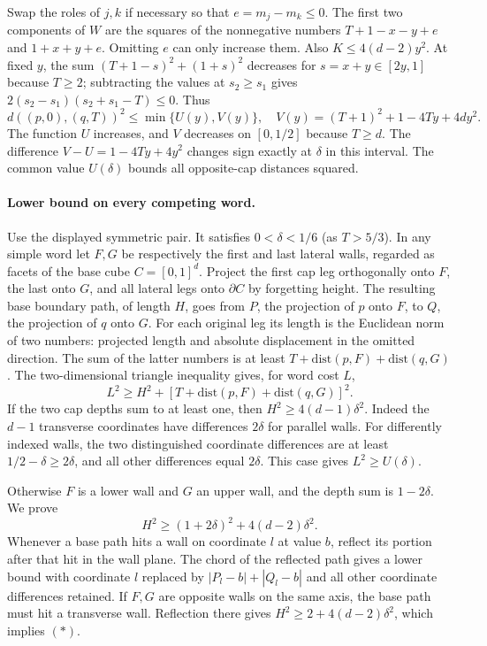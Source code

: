 \documentclass[10pt,letterpaper]{article}
\begin{document}
Swap the roles of $j,k$ if necessary so that $e=m_j-m_k\le0$.
The first two components of $W$ are the squares of the nonnegative
numbers $T+1-x-y+e$ and $1+x+y+e$. Omitting $e$ can only increase
them. Also $K\le4(d-2)y^2$. At fixed $y$, the sum
$(T+1-s)^2+(1+s)^2$ decreases for $s=x+y\in[2y,1]$ because
$T\ge2$; subtracting the values at $s_2\ge s_1$ gives
$2(s_2-s_1)(s_2+s_1-T)\le0$. Thus
\[
 d((p,0),(q,T))^2\le \min\{U(y),V(y)\},\quad
 V(y)=(T+1)^2+1-4Ty+4dy^2.
\]
The function $U$ increases, and $V$ decreases on $[0,1/2]$ because
$T\ge d$. The difference $V-U=1-4Ty+4y^2$ changes sign exactly
at $\delta$ in this interval. The common value $U(\delta)$ bounds
all opposite-cap distances squared.

\paragraph{Lower bound on every competing word.}
Use the displayed symmetric pair. It satisfies $0<\delta<1/6$
(as $T>5/3$). In any simple word let $F,G$ be respectively the first
and last lateral walls, regarded as facets of the base cube $C=[0,1]^d$.
Project the first cap leg orthogonally onto $F$, the last onto $G$,
and all lateral legs onto $\partial C$ by forgetting height.
The resulting base boundary path, of length $H$, goes from $P$, the
projection of $p$ onto $F$, to $Q$, the projection of $q$ onto $G$.
For each original leg its length is the Euclidean norm of two numbers:
projected length and absolute displacement in the omitted direction.
The sum of the latter numbers is at least
$T+\mathrm{dist}(p,F)+\mathrm{dist}(q,G)$.
The two-dimensional triangle inequality gives, for word cost $L$,
\[
 L^2\ge H^2+
 [T+\mathrm{dist}(p,F)+\mathrm{dist}(q,G)]^2.
\]
If the two cap depths sum to at least one, then $H^2\ge4(d-1)\delta^2$.
Indeed the $d-1$ transverse coordinates have differences $2\delta$
for parallel walls. For differently indexed walls, the two distinguished
coordinate differences are at least $1/2-\delta\ge2\delta$, and all
other differences equal $2\delta$. This case gives $L^2\ge U(\delta)$.

Otherwise $F$ is a lower wall and $G$ an upper wall, and the depth sum
is $1-2\delta$. We prove
\[
 H^2\ge(1+2\delta)^2+4(d-2)\delta^2.                 \tag{*}
\]
Whenever a base path hits a wall on coordinate $l$ at value $b$,
reflect its portion after that hit in the wall plane. The chord of
the reflected path gives a lower bound with coordinate $l$ replaced
by $|P_l-b|+|Q_l-b|$ and all other coordinate differences retained.
If $F,G$ are opposite walls on the same axis, the base path must
hit a transverse wall. Reflection there gives
$H^2\ge2+4(d-2)\delta^2$, which implies $(*)$.
\end{document}
